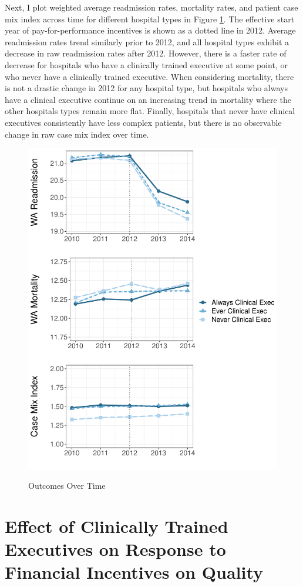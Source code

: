 \documentclass[12pt]{article}
\begin{document}
    Next, I plot weighted average readmission rates, mortality rates, and patient case mix index across time for different hospital types in Figure \ref{fig:outcomes_graph}. The effective start year of pay-for-performance incentives is shown as a dotted line in 2012. Average readmission rates trend similarly prior to 2012, and all hospital types exhibit a decrease in raw readmission rates after 2012. However, there is a faster rate of decrease for hospitals who have a clinically trained executive at some point, or who never have a clinically trained executive. When considering mortality, there is not a drastic change in 2012 for any hospital type, but hospitals who always have a clinical executive continue on an increasing trend in mortality where the other hospitals types remain more flat. Finally, hospitals that never have clinical executives consistently have less complex patients, but there is no observable change in raw case mix index over time.

    \begin{figure}[ht!]
    \centering
        \caption{Outcomes Over Time}
        \includegraphics[width=.8\textwidth]{Objects/outcomes_graph.pdf}
        \label{fig:outcomes_graph}
    \end{figure}


    \section{Effect of Clinically Trained Executives on Response to Financial Incentives on Quality}\label{sec:clinical}
\end{document}
